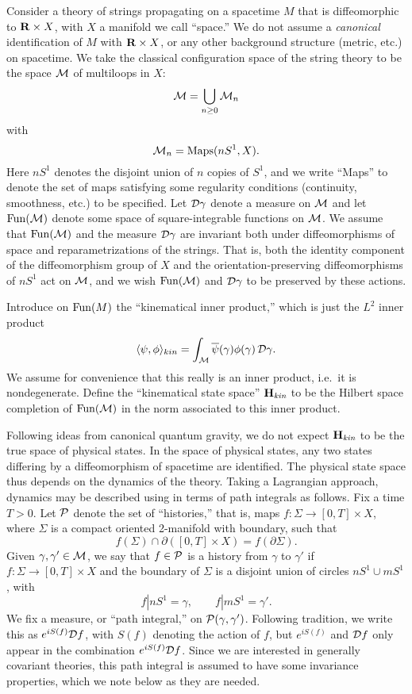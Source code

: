 \documentclass[12pt]{article}
\newcommand{\maps}{\colon}
\newcommand{\M}{{\cal M}}
\renewcommand{\P}{{\cal P}}
\newcommand{\D}{{\cal D}}
\renewcommand{\H}{{\bf H}}
\newcommand{\R}{{\bf R}}
\newcommand{\Maps}{{\rm Maps}}
\newcommand{\Fun}{{\rm Fun}}
\begin{document}
Consider a theory of strings
propagating on a spacetime $M$ that is diffeomorphic to
$\R\times X$, with $X$ a manifold we call ``space.'' We do not
assume a {\it canonical} identification of $M$ with
$\R\times X$, or any other background structure (metric, etc.) on
spacetime.  We take the classical
configuration space of the string theory to be the space $\M$
of multiloops in $X$:
\[ \M = \bigcup_{n \ge 0} \M_n \]
with
\[ \M_n = \Maps(nS^1, X) .\]
Here $nS^1$ denotes the disjoint union of $n$ copies
of $S^1$, and we write ``Maps'' to denote the set of maps satisfying
some regularity conditions (continuity, smoothness, etc.) to be
specified.  Let $\D\gamma$
denote a measure on $\M$ and let
$\Fun(\M)$ denote some space of square-integrable functions on $\M$.
We assume that $\Fun(\M)$ and the measure
$\D\gamma$ are invariant both under diffeomorphisms of space and
reparametrizations of the strings.  That is, both the
identity component of the diffeomorphism group of $X$ and
the orientation-preserving diffeomorphisms of $nS^1$
act on $\M$, and we wish $\Fun(\M)$ and $\D\gamma$ to be preserved by
these actions.

Introduce on $\Fun(M)$ the ``kinematical inner product,'' which is
just the $L^2$ inner product
\[ \langle \psi,\phi\rangle_{kin} = \int_{\M}
\overline\psi(\gamma) \phi(\gamma) \, \D\gamma  .\]
We assume for convenience that this really is an inner product, i.e.\
it is nondegenerate.
Define the ``kinematical state space''
$\H_{\textit{kin}}$ to be the Hilbert space completion of
$\Fun(\M)$ in the norm associated to this inner product.

Following ideas from canonical quantum gravity, we do not expect $\H_{\textit{kin}}$
to be the true space of physical states.   In the space of physical states,
any two states differing by a diffeomorphism of spacetime are identified.
The physical state space thus depends on the dynamics of the theory.
Taking a Lagrangian approach, dynamics may be described using in terms of
path integrals as follows.   Fix a time $T > 0$.  Let $\P$ denote the set
of ``histories,'' that is, maps $f \maps \Sigma \to [0,T] \times X$, where
$\Sigma$ is a compact oriented 2-manifold with boundary, such that
\[       f(\Sigma) \cap \partial([0,T] \times X) = f(\partial\Sigma) .\]
Given
$\gamma,\gamma' \in \M$, we say that $f \in \P$ is a history from $\gamma$
to $\gamma'$ if $f \maps \Sigma \to [0,T] \times X$ and the boundary of
$\Sigma$ is a disjoint union of circles $nS^1 \cup mS^1$, with
 \[          f|nS^1 = \gamma ,\qquad f|mS^1 = \gamma' .\]
We fix a measure, or ``path
integral,'' on $\P(\gamma,\gamma')$.  Following tradition, we write this as
$ e^{iS(f)} \D f$, with $S(f)$ denoting the action of $f$, but $e^{iS(f)}$
and $\D f$ only appear in the combination $ e^{iS(f)}\D f$.  Since we are
interested in generally covariant theories, this path integral is assumed
to have some invariance properties, which we note below as they are needed.
\end{document}
